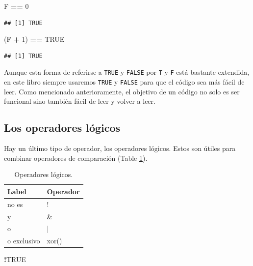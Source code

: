 \documentclass[]{book}
\newenvironment{Shaded}{\begin{snugshade}}{\end{snugshade}}
\newcommand{\DecValTok}[1]{\textcolor[rgb]{0.00,0.00,0.81}{#1}}
\newcommand{\StringTok}[1]{\textcolor[rgb]{0.31,0.60,0.02}{#1}}
\newcommand{\OtherTok}[1]{\textcolor[rgb]{0.56,0.35,0.01}{#1}}
\newcommand{\OperatorTok}[1]{\textcolor[rgb]{0.81,0.36,0.00}{\textbf{#1}}}
\newcommand{\NormalTok}[1]{#1}
\begin{document}
\begin{Shaded}
\begin{Highlighting}[]
\NormalTok{F }\OperatorTok{==}\StringTok{ }\DecValTok{0}
\end{Highlighting}
\end{Shaded}

\begin{verbatim}
## [1] TRUE
\end{verbatim}

\begin{Shaded}
\begin{Highlighting}[]
\NormalTok{(F }\OperatorTok{+}\StringTok{ }\DecValTok{1}\NormalTok{) }\OperatorTok{==}\StringTok{ }\OtherTok{TRUE}
\end{Highlighting}
\end{Shaded}

\begin{verbatim}
## [1] TRUE
\end{verbatim}

Aunque esta forma de referirse a \texttt{TRUE} y \texttt{FALSE} por
\texttt{T} y \texttt{F} está bastante extendida, en este libro siempre
usaremos \texttt{TRUE} y \texttt{FALSE} para que el código sea más fácil
de leer. Como mencionado anterioramente, el objetivo de un código no
solo es ser funcional sino también fácil de leer y volver a leer.

\subsection{Los operadores lógicos}\label{los-operadores-logicos}

Hay un último tipo de operador, los operadores lógicos. Estos son útiles
para combinar operadores de comparación (Table \ref{tab:tabOpLog}).

\begin{table}

\caption{\label{tab:tabOpLog}Operadores lógicos.\label{tab:tabOpLog}}
\centering
\begin{tabular}[t]{l|l}
\hline
Label & Operador\\
\hline
no es & !\\
\hline
y & \&\\
\hline
o & |\\
\hline
o exclusivo & xor()\\
\hline
\end{tabular}
\end{table}

\begin{Shaded}
\begin{Highlighting}[]
\OperatorTok{!}\OtherTok{TRUE}
\end{Highlighting}
\end{Shaded}
\end{document}
